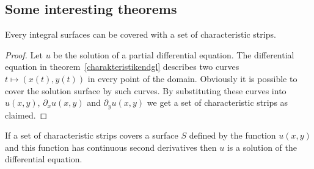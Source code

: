 \subsection{Some interesting theorems}

\begin{satz}
Every integral surfaces can be covered with a set of characteristic
strips.
\end{satz}

\begin{proof}
Let $u$ be the solution of a partial differential equation.
The differential equation in theorem~\ref{charakteristikendgl}
describes two curves $t\mapsto(x(t),y(t))$ in every point of the domain.
Obviously it is possible to cover the solution surface by such curves.
By substituting these curves into $u(x,y)$, $\partial_xu(x,y)$
and $\partial_yu(x,y)$ we get a set of characteristic strips
as claimed.
\end{proof}

\begin{satz}
If a set of characteristic strips covers a surface $S$ defined
by the function $u(x,y)$ and this function has continuous 
second derivatives then $u$ is a solution of the differential equation.
\end{satz}

